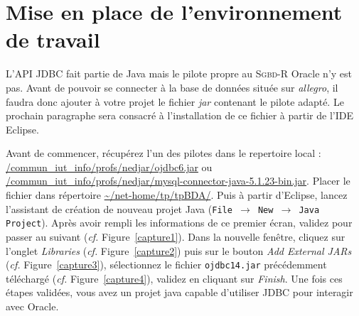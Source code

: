 \documentclass[a4paper,11pt]{article}
\newenvironment{agrandirmarges}[2]{%
\begin{list}{}{%
\setlength{\topsep}{0pt}%
\setlength{\listparindent}{\parindent}%
\setlength{\itemindent}{\parindent}%
\setlength{\parsep}{0pt plus 1pt}%
\checkoddpage%
\ifoddpage
\setlength{\leftmargin}{-#1}\setlength{\rightmargin}{-#2}
\else
\setlength{\leftmargin}{-#2}\setlength{\rightmargin}{-#1}
\fi}\item }%
{\end{list}}
\begin{document}
\section{Mise en place de l'environnement de travail}

L'API JDBC fait partie de Java mais le pilote propre au \textsc{Sgbd-R} Oracle n'y est pas. Avant de pouvoir se connecter 
à la base de données située sur \emph{allegro}, il faudra donc ajouter à votre projet le fichier \emph{jar} contenant le pilote 
adapté. Le prochain paragraphe sera consacré à l'installation de ce fichier à partir de l'IDE Eclipse.

Avant de commencer, récupérez l'un des pilotes dans le repertoire local : \url{/commun\_iut\_info/profs/nedjar/ojdbc6.jar} ou 
\url{/commun\_iut\_info/profs/nedjar/mysql-connector-java-5.1.23-bin.jar}. 
Placer le fichier dans répertoire \url{~/net-home/tp/tpBDA/}. Puis à partir d'Eclipse, lancez 
l'assistant de création de nouveau projet Java (\texttt{File $\rightarrow$ New $\rightarrow$ Java Project}).
Après avoir rempli les informations de ce premier écran, validez pour passer au suivant (\emph{cf.} Figure~\ref{capture1}).
Dans la nouvelle fenêtre, cliquez sur l'onglet \emph{Libraries} (\emph{cf.} Figure~\ref{capture2})
puis sur le bouton \emph{Add External JARs} (\emph{cf.} Figure~\ref{capture3}), sélectionnez le fichier \texttt{ojdbc14.jar} 
précédemment téléchargé (\emph{cf.} Figure~\ref{capture4}), validez en cliquant sur \emph{Finish}. Une fois ces étapes validées, 
vous avez un projet java capable d'utiliser JDBC pour interagir avec Oracle.
\begin{figure}\centering
  \begin{agrandirmarges}{1cm}{1cm}
    \hfill%
    \\

    \hfill%
    \caption{}
  \end{agrandirmarges}
\end{figure}
\end{document}
